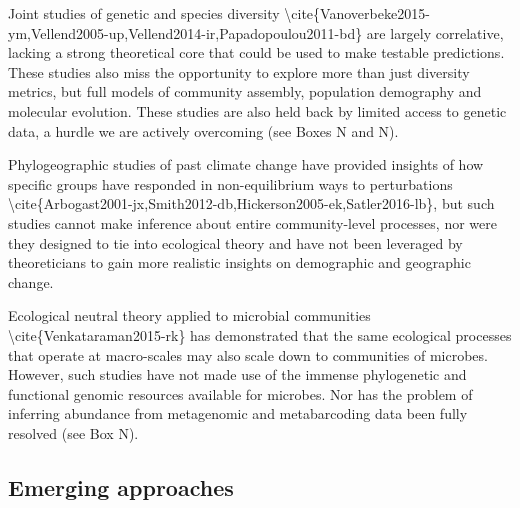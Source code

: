 \documentclass[]{article}
\begin{document}
Joint studies of genetic and species diversity
\textbackslash{}cite\{Vanoverbeke2015-ym,Vellend2005-up,Vellend2014-ir,Papadopoulou2011-bd\}
are largely correlative, lacking a strong theoretical core that could be
used to make testable predictions. These studies also miss the
opportunity to explore more than just diversity metrics, but full models
of community assembly, population demography and molecular evolution.
These studies are also held back by limited access to genetic data, a
hurdle we are actively overcoming (see Boxes N and N).

Phylogeographic studies of past climate change have provided insights of
how specific groups have responded in non-equilibrium ways to
perturbations
\textbackslash{}cite\{Arbogast2001-jx,Smith2012-db,Hickerson2005-ek,Satler2016-lb\},
but such studies cannot make inference about entire community-level
processes, nor were they designed to tie into ecological theory and have
not been leveraged by theoreticians to gain more realistic insights on
demographic and geographic change.

Ecological neutral theory applied to microbial communities
\textbackslash{}cite\{Venkataraman2015-rk\} has demonstrated that the
same ecological processes that operate at macro-scales may also scale
down to communities of microbes. However, such studies have not made use
of the immense phylogenetic and functional genomic resources available
for microbes. Nor has the problem of inferring abundance from
metagenomic and metabarcoding data been fully resolved (see Box N).

\subsection{Emerging approaches}\label{emerging-approaches}
\end{document}
